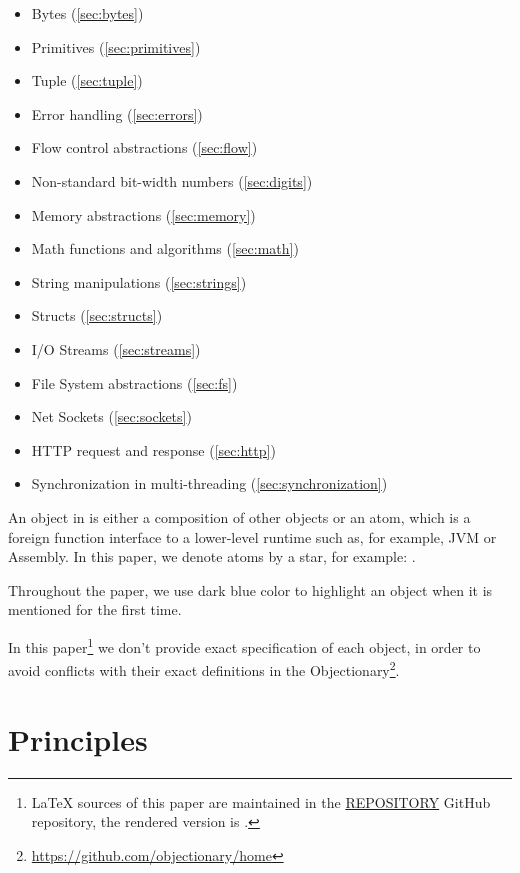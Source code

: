 \documentclass[sigplan,nonacm]{acmart}
\newcommand\aff[1]{\ff{\textcolor{gray}{\(\star\)}#1}}
\begin{document}
\begin{itemize}
    \item Bytes (\cref{sec:bytes})
    \item Primitives (\cref{sec:primitives})
    \item Tuple (\cref{sec:tuple})
    \item Error handling (\cref{sec:errors})
    \item Flow control abstractions (\cref{sec:flow})
    \item Non-standard bit-width numbers (\cref{sec:digits})
    \item Memory abstractions (\cref{sec:memory})
    \item Math functions and algorithms (\cref{sec:math})
    \item String manipulations (\cref{sec:strings})
    \item Structs (\cref{sec:structs})
    \item I/O Streams (\cref{sec:streams})
    \item File System abstractions (\cref{sec:fs})
    \item Net Sockets (\cref{sec:sockets})
    \item HTTP request and response (\cref{sec:http})
    \item Synchronization in multi-threading (\cref{sec:synchronization})
\end{itemize}

An object in \eolang{} is either a composition of other objects or an atom, which is a foreign function interface to a lower-level runtime such as, for example, JVM or Assembly.
In this paper, we denote atoms by a star, for example: \aff{times}.

Throughout the paper, we use dark blue color to highlight an object when it is mentioned for the first time.

In this paper\footnote{%
\LaTeX{} sources of this paper are maintained in the
\href{https://github.com/REPOSITORY}{REPOSITORY} GitHub repository,
the rendered version is \href{https://github.com/REPOSITORY/releases/tag/0.0.0}{}.}
we don't provide exact specification of each object, in order to avoid conflicts with their exact definitions in the Objectionary\footnote{\url{https://github.com/objectionary/home}}.

\section{Principles}
\end{document}
